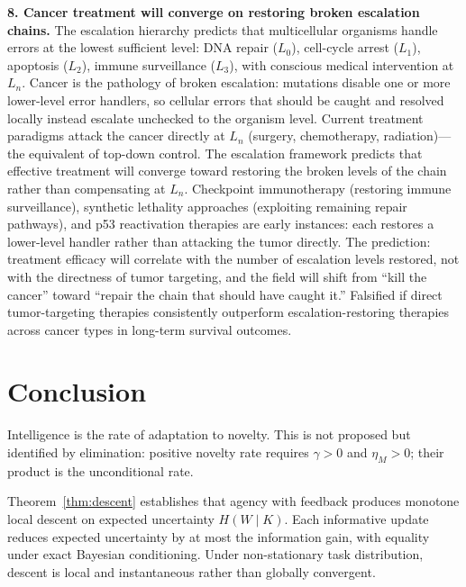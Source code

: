 \documentclass[11pt]{article}
\theoremstyle{definition}
\theoremstyle{remark}
\begin{document}
\textbf{8. Cancer treatment will converge on restoring broken
escalation chains.}
The escalation hierarchy \cite{McCarthy2026b} predicts that
multicellular organisms handle errors at the lowest sufficient level:
DNA repair ($L_0$), cell-cycle arrest ($L_1$), apoptosis ($L_2$),
immune surveillance ($L_3$), with conscious medical intervention at
$L_n$. Cancer is the pathology of broken escalation: mutations disable
one or more lower-level error handlers, so cellular errors that should
be caught and resolved locally instead escalate unchecked to the
organism level. Current treatment paradigms attack the cancer
directly at $L_n$ (surgery, chemotherapy, radiation)---the equivalent
of top-down control. The escalation framework predicts that effective
treatment will converge toward restoring the broken levels of the
chain rather than compensating at $L_n$. Checkpoint immunotherapy
(restoring immune surveillance), synthetic lethality approaches
(exploiting remaining repair pathways), and p53 reactivation therapies
are early instances: each restores a lower-level handler rather than
attacking the tumor directly. The prediction: treatment efficacy will
correlate with the number of escalation levels restored, not with the
directness of tumor targeting, and the field will shift from
``kill the cancer'' toward ``repair the chain that should have caught
it.'' Falsified if direct tumor-targeting therapies consistently
outperform escalation-restoring therapies across cancer types in
long-term survival outcomes.

\section{Conclusion}
\label{sec:conclusion}

Intelligence is the rate of adaptation to novelty. This is not proposed
but identified by elimination: positive novelty rate requires $\gamma > 0$
and $\eta_M > 0$; their product is the unconditional rate.

Theorem~\ref{thm:descent} establishes that agency with feedback
produces monotone local descent on expected uncertainty $H(W \mid K)$.
Each informative update reduces expected uncertainty by at most the
information gain, with equality under exact Bayesian conditioning. Under
non-stationary task distribution, descent is local and instantaneous
rather than globally convergent.
\end{document}
